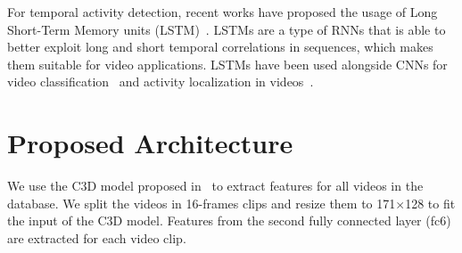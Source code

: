 \documentclass{article}
\begin{document}
For temporal activity detection, recent works have proposed the usage of Long Short-Term Memory units (LSTM)~\cite{hochreiter1997long}.
LSTMs are a type of RNNs that is able to better exploit long and short temporal correlations in sequences, which makes them suitable for video applications.
LSTMs have been used alongside CNNs for video classification~\cite{yao2015describing} and activity localization in videos~\cite{yeung2015every}.


\section{Proposed Architecture}



We use the C3D model proposed in~\cite{tran2014learning} to extract features for all videos in the database. We split the videos in 16-frames clips and resize them to 171$\times$128 to fit the input of the C3D model. Features from the second fully connected layer (fc6) are extracted for each video clip.


\end{document}
